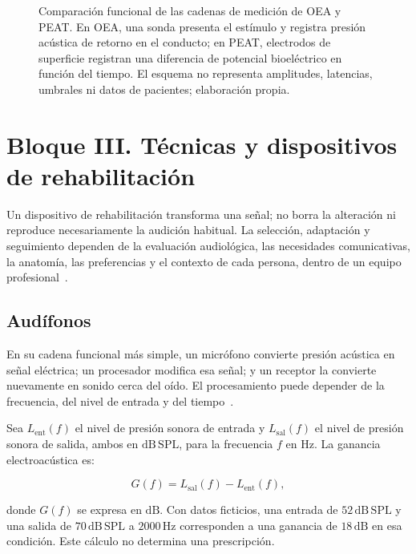 \begin{figure}[htbp]
    \centering
    \resizebox{\textwidth}{!}{%
    }
    \caption{Comparación funcional de las cadenas de medición de OEA y PEAT.
    En OEA, una sonda presenta el estímulo y registra presión acústica de
    retorno en el conducto; en PEAT, electrodos de superficie registran una
    diferencia de potencial bioeléctrico en función del tiempo. El esquema no
    representa amplitudes, latencias, umbrales ni datos de pacientes;
    elaboración propia.}
    \label{fig:u8-cadenas-oea-peat}
\end{figure}

\section{Bloque III. Técnicas y dispositivos de rehabilitación}
\label{sec:u8-rehabilitacion}

Un dispositivo de rehabilitación transforma una señal; no borra la
alteración ni reproduce necesariamente la audición habitual. La
selección, adaptación y seguimiento dependen de la evaluación audiológica,
las necesidades comunicativas, la anatomía, las preferencias y el contexto de
cada persona, dentro de un equipo profesional~\cite{ashaHearingAdults,skinnerGlattke1977}.

\subsection{Audífonos}
\label{sec:u8-audifonos}

En su cadena funcional más simple, un micrófono convierte presión acústica en
señal eléctrica; un procesador modifica esa señal; y un receptor la convierte
nuevamente en sonido cerca del oído. El procesamiento puede depender de la
frecuencia, del nivel de entrada y del tiempo~\cite{whoHearing2021}.

Sea \(L_{\mathrm{ent}}(f)\) el nivel de presión sonora de entrada y
\(L_{\mathrm{sal}}(f)\) el nivel de presión sonora de salida, ambos en
\(\mathrm{dB\,SPL}\), para la frecuencia \(f\) en \(\mathrm{Hz}\). La
ganancia electroacústica es:

\begin{equation}
    G(f)=L_{\mathrm{sal}}(f)-L_{\mathrm{ent}}(f),
    \label{eq:u8-ganancia}
\end{equation}

donde \(G(f)\) se expresa en \(\mathrm{dB}\). Con datos ficticios, una entrada
de \(52\,\mathrm{dB\,SPL}\) y una salida de
\(70\,\mathrm{dB\,SPL}\) a \(2000\,\mathrm{Hz}\) corresponden a
una ganancia de \(18\,\mathrm{dB}\) en esa condición. Este cálculo no
determina una prescripción.

